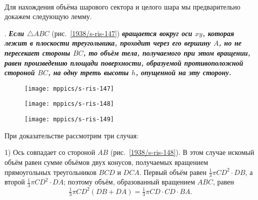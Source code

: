 \paragraph{}\label{1938/s141}
Для нахождения объёма шарового сектора и целого шара мы предварительно докажем следующую лемму.




\medskip

\mbox{.}
\textbf{\emph{Если $\triangle ABC$}} (рис.~\ref{1938/s-ris-147}) \textbf{\emph{вращается вокруг оси $xy$, которая лежит в плоскости треугольника, проходит через его вершину $A$, но не пересекает стороны $BC$, то объём тела, получаемого при этом вращении, равен произведению площади поверхности, образуемой противоположной стороной $BC$, на одну треть высоты $h$, опущенной на эту сторону.}}

\begin{figure}[h!]
\begin{minipage}{.32\textwidth}
\centering
\texttt{[image: mppics/s-ris-147]}
\end{minipage}
\hfill
\begin{minipage}{.32\textwidth}
\centering
\texttt{[image: mppics/s-ris-148]}
\end{minipage}
\hfill
\begin{minipage}{.32\textwidth}
\centering
\texttt{[image: mppics/s-ris-149]}
\end{minipage}

\medskip

\begin{minipage}{.32\textwidth}
\centering
\caption{}\label{1938/s-ris-147}
\end{minipage}
\hfill
\begin{minipage}{.32\textwidth}
\centering
\caption{}\label{1938/s-ris-148}
\end{minipage}
\hfill
\begin{minipage}{.32\textwidth}
\centering
\caption{}\label{1938/s-ris-149}
\end{minipage}
\vskip-4mm
\end{figure}

При доказательстве рассмотрим три случая:

1) Ось совпадает со стороной $AB$ (рис.~\ref{1938/s-ris-148}).
В этом случае искомый объём равен сумме объёмов двух конусов, получаемых вращением прямоугольных треугольников $BCD$ и $DCA$.
Первый объём равен $\tfrac13 \pi CD^2\cdot DB$, а второй $\tfrac13\pi CD^2\cdot DA$;
поэтому объём, образованный вращением $ABC$, равен 
\[\tfrac13\pi CD^2(DB + DA) = \tfrac13\pi CD\cdot CD\cdot BA.\]

